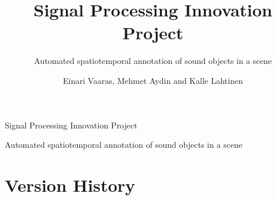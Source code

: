 \documentclass[english]{tauthesis}
\begin{document}

\frontmatter


\title{Signal Processing Innovation Project}{Signal Processing Innovation Project}
\subtitle{Automated spatiotemporal annotation of sound objects in a scene}{Automated spatiotemporal annotation of sound objects in a scene}

\author{Einari Vaaras, Mehmet Aydin and Kalle Lahtinen}




\programmename{}{}

\keywords%
    {}
    {}

\maketitle

\clearpage
{}
\section*{Version History}
\label{ch:version_history}


\end{document}
